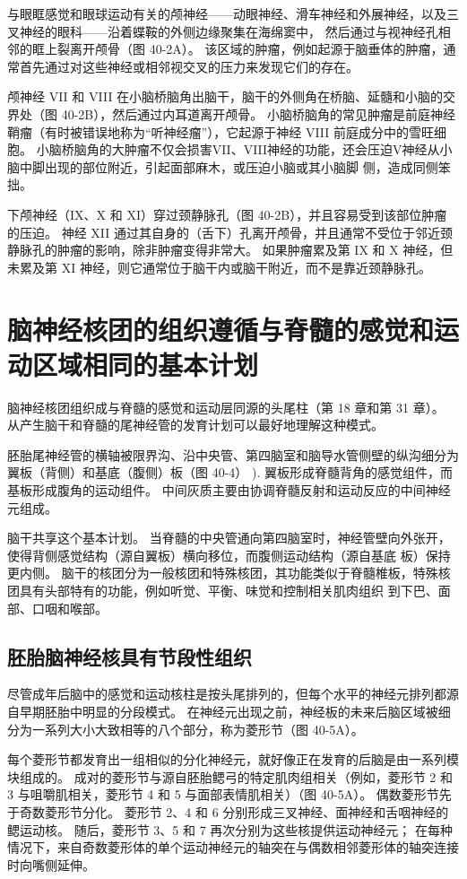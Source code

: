 与眼眶感觉和眼球运动有关的颅神经——动眼神经、滑车神经和外展神经，以及三叉神经的眼科——沿着蝶鞍的外侧边缘聚集在海绵窦中， 然后通过与视神经孔相邻的眶上裂离开颅骨（图 40-2A）。 该区域的肿瘤，例如起源于脑垂体的肿瘤，通常首先通过对这些神经或相邻视交叉的压力来发现它们的存在。

颅神经 VII 和 VIII 在小脑桥脑角出脑干，脑干的外侧角在桥脑、延髓和小脑的交界处（图 40-2B），然后通过内耳道离开颅骨。 小脑桥脑角的常见肿瘤是前庭神经鞘瘤（有时被错误地称为“听神经瘤”），它起源于神经 VIII 前庭成分中的雪旺细胞。 小脑桥脑角的大肿瘤不仅会损害VII、VIII神经的功能，还会压迫V神经从小脑中脚出现的部位附近，引起面部麻木，或压迫小脑或其小脑脚 侧，造成同侧笨拙。

下颅神经（IX、X 和 XI）穿过颈静脉孔（图 40-2B），并且容易受到该部位肿瘤的压迫。 神经 XII 通过其自身的（舌下）孔离开颅骨，并且通常不受位于邻近颈静脉孔的肿瘤的影响，除非肿瘤变得非常大。 如果肿瘤累及第 IX 和 X 神经，但未累及第 XI 神经，则它通常位于脑干内或脑干附近，而不是靠近颈静脉孔。


\section{脑神经核团的组织遵循与脊髓的感觉和运动区域相同的基本计划}
脑神经核团组织成与脊髓的感觉和运动层同源的头尾柱（第 18 章和第 31 章）。 从产生脑干和脊髓的尾神经管的发育计划可以最好地理解这种模式。

胚胎尾神经管的横轴被限界沟、沿中央管、第四脑室和脑导水管侧壁的纵沟细分为翼板（背侧）和基底（腹侧）板（图 40-4） ). 翼板形成脊髓背角的感觉组件，而基板形成腹角的运动组件。 中间灰质主要由协调脊髓反射和运动反应的中间神经元组成。

脑干共享这个基本计划。 当脊髓的中央管通向第四脑室时，神经管壁向外张开，使得背侧感觉结构（源自翼板）横向移位，而腹侧运动结构（源自基底 板）保持更内侧。 脑干的核团分为一般核团和特殊核团，其功能类似于脊髓椎板，特殊核团具有头部特有的功能，例如听觉、平衡、味觉和控制相关肌肉组织 到下巴、面部、口咽和喉部。



\subsection{胚胎脑神经核具有节段性组织}
尽管成年后脑中的感觉和运动核柱是按头尾排列的，但每个水平的神经元排列都源自早期胚胎中明显的分段模式。 在神经元出现之前，神经板的未来后脑区域被细分为一系列大小大致相等的八个部分，称为菱形节（图 40-5A）。

每个菱形节都发育出一组相似的分化神经元，就好像正在发育的后脑是由一系列模块组成的。 成对的菱形节与源自胚胎鳃弓的特定肌肉组相关（例如，菱形节 2 和 3 与咀嚼肌相关，菱形节 4 和 5 与面部表情肌相关）（图 40-5A）。 偶数菱形节先于奇数菱形节分化。 菱形节 2、4 和 6 分别形成三叉神经、面神经和舌咽神经的鳃运动核。 随后，菱形节 3、5 和 7 再次分别为这些核提供运动神经元； 在每种情况下，来自奇数菱形体的单个运动神经元的轴突在与偶数相邻菱形体的轴突连接时向嘴侧延伸。

